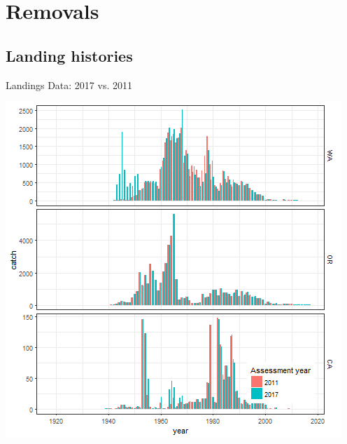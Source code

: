 \documentclass[pdf]{beamer}\usepackage[]{graphicx}\usepackage[]{color}
\begin{document}
\section{Removals}
\subsection{Landing histories}
\begin{frame}{Landings Data: 2017 vs. 2011}
  \begin{center}
    \includegraphics[scale = 0.45]{figures/pop2017_2011vs2017catches_states.png}
  \end{center}
\end{frame}
\end{document}
